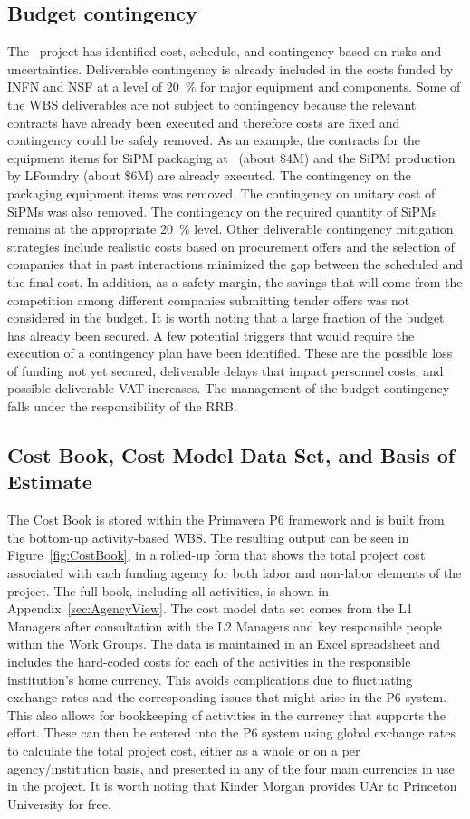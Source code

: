 \subsection{Budget contingency}
The \DSk\ project has identified cost, schedule, and contingency based on risks and uncertainties. Deliverable contingency is already included in the costs funded by INFN and NSF at a level of \SI{20}{\percent} for major equipment and components. Some of the WBS deliverables are not subject to contingency because the relevant contracts have already been executed and therefore costs are fixed and contingency could be safely removed. As an example, the contracts for the equipment items for SiPM packaging at \NOA\ (about \$4M) and the SiPM production by LFoundry (about \$6M) are already executed. The contingency on the packaging equipment items was removed. The contingency on unitary cost of SiPMs was also removed. The contingency on the required quantity of SiPMs remains at the appropriate \SI{20}{\percent} level. Other deliverable contingency mitigation strategies include realistic costs based on procurement offers and the selection of companies that in past interactions minimized the gap between the scheduled and the final cost. In addition, as a safety margin, the savings that will come from the competition among different companies submitting tender offers was not considered in the budget. It is worth noting that a large fraction of the budget has already been secured. A few potential triggers that would require the execution of a contingency plan have been identified. These are the possible loss of funding not yet secured, deliverable delays that impact personnel costs, and possible deliverable VAT increases.  The management of the budget contingency falls under the responsibility of the RRB.


\subsection{Cost Book, Cost Model Data Set, and Basis of Estimate}
The Cost Book is stored within the Primavera P6 framework and is built from the bottom-up activity-based WBS.  The resulting output can be seen in Figure~\ref{fig:CostBook}, in a rolled-up form that shows the total project cost associated with each funding agency for both labor and non-labor elements of the project.  The full book, including all activities, is shown in Appendix~\ref{sec:AgencyView}.  The cost model data set comes from the L1 Managers after consultation with the L2 Managers and key responsible people within the Work Groups.  The data is maintained in an Excel spreadsheet and includes the hard-coded costs for each of the activities in the responsible institution's home currency.  This avoids complications due to fluctuating exchange rates and the corresponding issues that might arise in the P6 system.  This also allows for bookkeeping of activities in the currency that supports the effort. These can then be entered into the P6 system using global exchange rates to calculate the total project cost, either as a whole or on a per agency/institution basis, and presented in any of the four main currencies in use in the project. It is worth noting that Kinder Morgan provides UAr to Princeton University for free.

